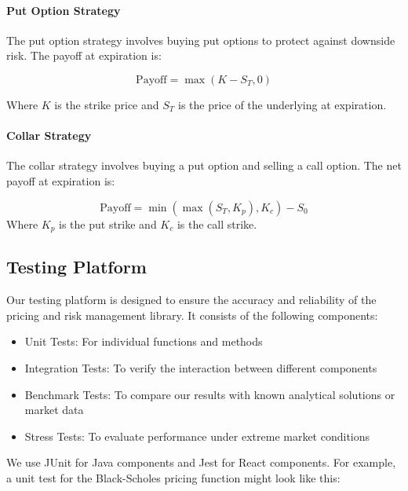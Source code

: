 \documentclass[12pt]{article}
\begin{document}
\paragraph{Put Option Strategy}

The put option strategy involves buying put options to protect against downside risk. The payoff at expiration is:

\begin{equation}
    \text{Payoff} = \max(K - S_T, 0)
\end{equation}

Where $K$ is the strike price and $S_T$ is the price of the underlying at expiration.

\paragraph{Collar Strategy}

The collar strategy involves buying a put option and selling a call option. The net payoff at expiration is:

\begin{equation}
    \text{Payoff} = \min(\max(S_T, K_p), K_c) - S_0
\end{equation}
Where $K_p$ is the put strike and $K_c$ is the call strike.

\subsection{Testing Platform}

Our testing platform is designed to ensure the accuracy and reliability of the pricing and risk management library. It consists of the following components:

\begin{itemize}
    \item Unit Tests: For individual functions and methods
    \item Integration Tests: To verify the interaction between different components
    \item Benchmark Tests: To compare our results with known analytical solutions or market data
    \item Stress Tests: To evaluate performance under extreme market conditions
\end{itemize}

We use JUnit for Java components and Jest for React components. For example, a unit test for the Black-Scholes pricing function might look like this:
\end{document}
